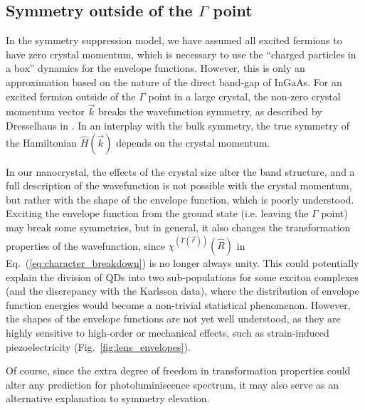 \subsection{Symmetry outside of the $\Gamma$ point} \label{sec:symmetry_outside_gamma}
In the symmetry suppression model, we have assumed all excited fermions to have zero crystal momentum, which is necessary to use the ``charged particles in a box'' dynamics for the envelope functions. However, this is only an approximation based on the nature of the direct band-gap of InGaAs. For an excited fermion outside of the $\Gamma$ point in a large crystal, the non-zero crystal momentum vector $\vec{k}$ breaks the wavefunction symmetry, as described by Dresselhaus in \cite[Ch.~13]{dresselhaus}. In an interplay with the bulk symmetry, the true symmetry of the Hamiltonian $\hat{H}\left(\vec{k}\right)$ depends on the crystal momentum. 

In our nanocrystal, the effects of the crystal size alter the band structure, and a full description of the wavefunction is not possible with the crystal momentum, but rather with the shape of the envelope function, which is poorly understood. Exciting the envelope function from the ground state (i.e. leaving the $\Gamma$ point) may break some symmetries, but in general, it also changes the transformation properties of the wavefunction, since $\chi^{\left(\Upsilon\left(\vec{r}\right)\right)}\left(\hat{R}\right)$ in Eq.~(\ref{eq:character_breakdown}) is no longer always unity. This could potentially explain the division of QDs into two sub-populations for some exciton complexes (and the discrepancy with the Karlsson data), where the distribution of envelope function energies would become a non-trivial statistical phenomenon. However, the shapes of the envelope functions are not yet well understood, as they are highly sensitive to high-order or mechanical effects, such as strain-induced piezoelectricity (Fig.~\ref{fig:lens_envelopes}).

Of course, since the extra degree of freedom in transformation properties could alter any prediction for photoluminiscence spectrum, it may also serve as an alternative explanation to symmetry elevation.\\

